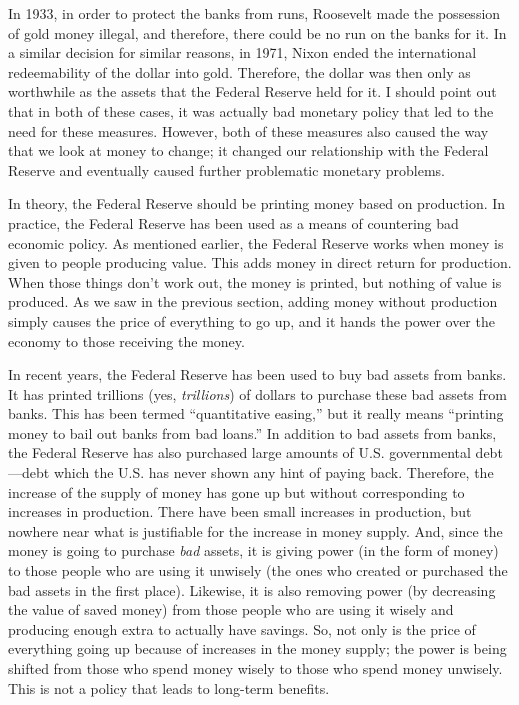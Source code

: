 In 1933, in order to protect the banks from runs, Roosevelt made the
possession of gold money illegal, and therefore, there could be no run
on the banks for it. In a similar decision for similar reasons, in
1971, Nixon ended the international redeemability of the dollar into
gold. Therefore, the dollar was then only as worthwhile as the assets
that the Federal Reserve held for it. I should point out that in both
of these cases, it was actually bad monetary policy that led to the
need for these measures. However, both of these measures also caused
the way that we look at money to change; it changed our relationship
with the Federal Reserve and eventually caused further problematic
monetary problems.

In theory, the Federal Reserve should be printing money based on
production. In practice, the Federal Reserve has been used as a means
of countering bad economic policy. As mentioned earlier, the Federal
Reserve works when money is given to people producing value. This adds
money in direct return for production. When those things don’t work
out, the money is printed, but nothing of value is produced. As we saw
in the previous section, adding money without production simply causes
the price of everything to go up, and it hands the power over the
economy to those receiving the money.  

In recent years, the Federal Reserve has been used to buy bad assets
from banks. It has printed trillions (yes, \textit{trillions}) of
dollars to purchase these bad assets from banks. This has been termed
“quantitative easing,” but it really means “printing money to bail out
banks from bad loans.”  In addition to bad assets from banks, the
Federal Reserve has also purchased large amounts of U.S. governmental
debt—debt which the U.S. has never shown any hint of paying back.
Therefore, the increase of the supply of money has gone up but without
corresponding to increases in production. There have been small
increases in production, but nowhere near what is justifiable for the
increase in money supply. And, since the money is going to purchase
\textit{bad} assets, it is giving power (in the form of money) to those
people who are using it unwisely (the ones who created or purchased the
bad assets in the first place).  Likewise, it is also removing power
(by decreasing the value of saved money) from those people who are
using it wisely and
producing enough extra to actually have
savings.  So, not
only is the price of everything going up because of increases in the
money supply; the power is being shifted from those who spend money
wisely to those who spend money unwisely. This is not a policy that
leads to long-term benefits.

